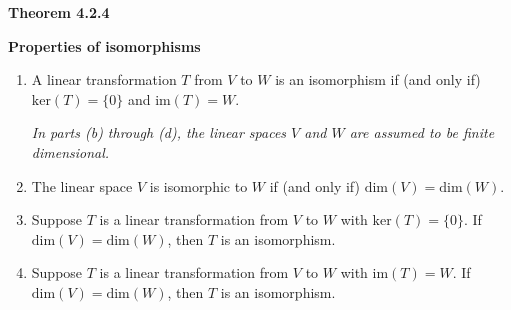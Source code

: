 \textbf{Theorem 4.2.4}\\
\par\noindent\textbf{Properties of isomorphisms}
\renewcommand{\labelenumi}{\textbf{\alph{enumi}.}}
\begin{enumerate}
\item A linear transformation $T$ from $V$ to $W$ is an isomorphism if (and only if) $\textrm{ker}(T)=\{0\}$ and $\textrm{im}(T)=W$.
\par\noindent\textit{In parts (b) through (d), the linear spaces $V$ and $W$ are assumed to be finite dimensional.}
\item The linear space $V$ is isomorphic to $W$ if (and only if) $\textrm{dim}(V)=\textrm{dim}(W)$.
\item Suppose $T$ is a linear transformation from $V$ to $W$ with $\textrm{ker}(T)=\{0\}$. If $\textrm{dim}(V)=\textrm{dim}(W)$, then $T$ is an isomorphism.
\item Suppose $T$ is a linear transformation from $V$ to $W$ with $\textrm{im}(T)=W$. If $\textrm{dim}(V)=\textrm{dim}(W)$, then $T$ is an isomorphism.
\end{enumerate}

